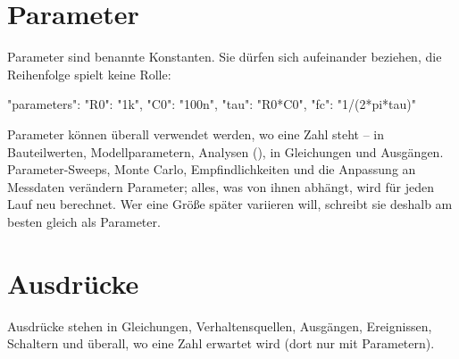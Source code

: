 \section{Parameter}
\label{sec:parameter}

Parameter sind benannte Konstanten. Sie dürfen sich aufeinander beziehen,
die Reihenfolge spielt keine Rolle:

\begin{json}
"parameters": { "R0": "1k", "C0": "100n", "tau": "R0*C0", "fc": "1/(2*pi*tau)" }
\end{json}

Parameter können überall verwendet werden, wo eine Zahl steht – in
Bauteilwerten, Modellparametern, Analysen (), in
Gleichungen und Ausgängen. Parameter-Sweeps, Monte Carlo,
Empfindlichkeiten und die Anpassung an Messdaten verändern Parameter; alles,
was von ihnen abhängt, wird für jeden Lauf neu berechnet. Wer eine Größe
später variieren will, schreibt sie deshalb am besten gleich als Parameter.

\section{Ausdrücke}
\label{sec:ausdruecke}

Ausdrücke stehen in Gleichungen, Verhaltensquellen, Ausgängen, Ereignissen,
Schaltern und überall, wo eine Zahl erwartet wird (dort nur mit
Parametern).

